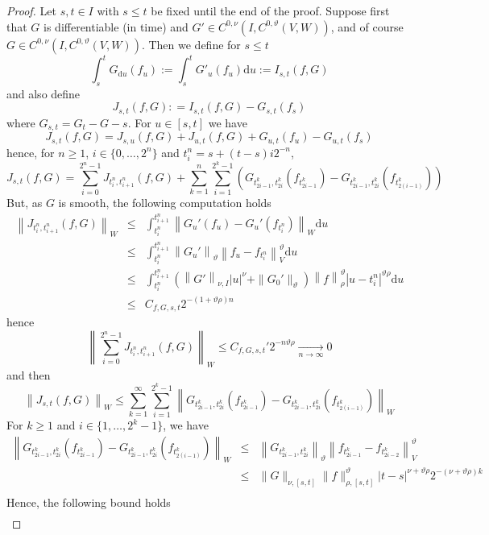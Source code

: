 \documentclass[11pt,a4paper,draft,reqno]{amsart}
\theoremstyle{definition}
\newcommand{\dd}{\mathrm{d}}
\begin{document}
\begin{proof}
Let $s,t\in I$ with $s\le t$ be fixed until the end of the proof. Suppose first that $G$ is differentiable (in time) and  $G' \in C^{0,\nu}\left(I, C^{0,\vartheta}(V,W)\right)$, and of course $G\in C^{0,\nu}(I,C^{0,\vartheta}(V,W))$. Then we define for $s \le t$
$$\int_s^tG_{\dd u}(f_u)  :=\int_s^tG'_u(f_u) \dd u:= I_{s,t} (f,G)$$
and also define 
$$J_{s,t}(f,G) : = I_{s,t}(f,G)-G_{s,t}(f_s)$$
where $G_{s,t}=G_t-G-s$.
For $u\in [s,t]$ we have
$$J_{s,t}(f,G) = J_{s,u}(f,G) + J_{u,t}(f,G) + G_{u,t}(f_u) - G_{u,t}(f_s)  $$
hence, for $n\ge 1$, $i \in \{0,\dots,2^n\}$ and $t_i^n = s + (t-s)i2^{-n}$, 
$$
J_{s,t}(f,G) = \sum_{i=0}^{2^n-1}J_{t_i^n,t_{i+1}^n}(f,G) + \sum_{k=1}^{n}\sum_{i=1}^{2^k-1}\left( G_{t_{2i-1}^k,t_{2i}^k}(f_{t_{2i-1}^k}) - G_{t_{2i-1}^k,t_{2i}^k}(f_{t_{2(i-1)}^k}) \right)
$$
But, as $G$ is smooth, the following computation holds
\begin{eqnarray*}
\left\|J_{t_{i}^n,t_{i+1}^n}(f,G)\right\|_W
&\le&
\int_{t_{i}^n}^{t_{i+1}^n}\left\|G_u'(f_u)-G_u'(f_{t_{i}^n})\right\|_W \dd u\\
&\le&
\int_{t_{i}^n}^{t_{i+1}^n}\left\|G_u'\right\|_{\vartheta}\left\|f_u-f_{t_{i}^n}\right\|^\vartheta_V \dd u\\
&\le&
\int_{t_{i}^n}^{t_{i+1}^n}\left(\left\|G'\right\|_{\nu,I}|u|^\nu + \|G_0'\|_{\vartheta}\right) \left\|f\right\|^\vartheta_\rho |u-t_{i}^n|^{\vartheta\rho} \dd u\\
&\le&
C_{f,G,s,t} 2^{-(1+\vartheta\rho)n}
\end{eqnarray*}
hence
$$\left\|\sum_{i=0}^{2^n-1}J_{t_i^n,t_{i+1}^n}(f,G)\right\|_W \le C_{f,G,s,t}' 2^{-n\vartheta\rho}\underset{n\to\infty}{\to}0$$
and then
$$\left\|J_{s,t}(f,G)\right\|_W \le \sum_{k=1}^{\infty}\sum_{i=1}^{2^k-1}\left\| G_{t_{2i-1}^k,t_{2i}^k}(f_{t_{2i-1}^k}) - G_{t_{2i-1}^k,t_{2i}^k}(f_{t_{2(i-1)}^k}) \right\|_W$$
For $k\ge 1$ and $i \in\{1,\dots,2^k-1\}$, we have
\begin{eqnarray*}
\left\| G_{t_{2i-1}^k,t_{2i}^k}(f_{t_{2i-1}^k}) - G_{t_{2i-1}^k,t_{2i}^k}(f_{t_{2(i-1)}^k}) \right\|_W
&\le&
\left\| G_{t_{2i-1}^k,t_{2i}^k}\right\|_{\vartheta}\left\|f_{t_{2i-1}^k}  -f_{t_{2i-2}^k}  \right\|^\vartheta_V\\
&\le&
\|G\|_{\nu,[s,t]} \|f\|^\vartheta_{\rho,[s,t]} |t-s|^{\nu+\vartheta\rho} 2^{-(\nu+\vartheta\rho) k} \\
\end{eqnarray*}
Hence, the following bound holds
\begin{equation*}
\begin{split}

\end{split}
\end{equation*}
\end{proof}
\end{document}

